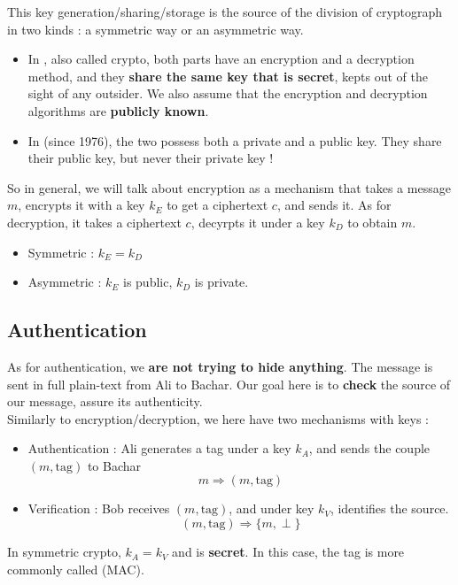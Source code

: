 \documentclass[a4paper, 12pt]{book}
\begin{document}
This key generation/sharing/storage is the source of the division of cryptograph in two kinds : a symmetric way or an asymmetric way.
\begin{itemize}
    \item In , also called  crypto, both parts have an encryption and a decryption method, and they \textbf{share the same key that is secret}, kepts out of the sight of any outsider. We also assume that the encryption and decryption algorithms are \textbf{publicly known}.
    \item In  (since 1976), the two possess both a private and a public key. They share their public key, but never their private key ! \\ 
\end{itemize}

So in general, we will talk about encryption as a mechanism that takes a message $m$, encrypts it with a key $k_E$ to get a ciphertext $c$, and sends it. As for decryption, it takes a ciphertext $c$, decyrpts it under a key $k_D$ to obtain $m$. 
\begin{itemize}
    \item Symmetric : $k_E = k_D$
    \item Asymmetric : $k_E$ is public, $k_D$ is private.
\end{itemize}

\subsection{Authentication}
As for authentication, we \textbf{are not trying to hide anything}. The message is sent in full plain-text from Ali to Bachar. Our goal here is to \textbf{check} the source of our message, assure its authenticity.\\

Similarly to encryption/decryption, we here have two mechanisms with keys :
\begin{itemize}
    \item Authentication : Ali generates a tag under a key $k_A$, and sends the couple $(m,\mathrm{tag})$ to Bachar
    $$m \Rightarrow (m, \mathrm{tag})$$
    \item Verification : Bob receives $(m,\mathrm{tag})$, and under key $k_V$, identifies the source.
    $$(m, \mathrm{tag}) \Rightarrow \{m, \perp\}$$
\end{itemize}

In symmetric crypto, $k_A = k_V$ and is \textbf{secret}. In this case, the tag is more commonly called  (MAC). \\
\end{document}
